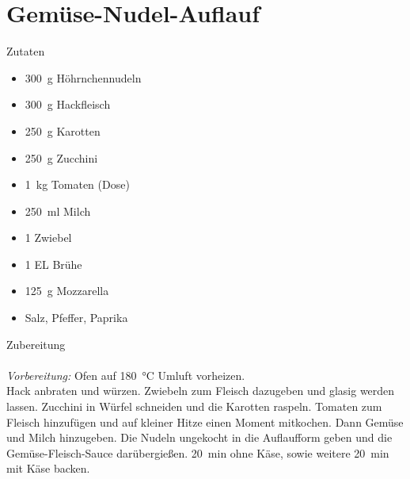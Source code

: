 \section*{Gemüse-Nudel-Auflauf}
\ihead{}\ohead{}
\cfoot{}
{\Large Zutaten}
\begin{multicols}{2}
\begin{itemize}
    \item \SI{300}{g} Höhrnchennudeln
    \item \SI{300}{g} Hackfleisch
    \item \SI{250}{g} Karotten
    \item \SI{250}{g} Zucchini
    \item \SI{1}{kg} Tomaten (Dose)
    \item \SI{250}{ml} Milch
    \item \num{1} Zwiebel
    \item \num{1} EL Brühe
    \item \SI{125}{g} Mozzarella
    \item Salz, Pfeffer, Paprika
\end{itemize}
\end{multicols}
\noindent
{\Large Zubereitung}\\
\\
\textit{Vorbereitung:} Ofen auf \SI{180}{\celsius} Umluft vorheizen.\\
Hack anbraten und würzen.
Zwiebeln zum Fleisch dazugeben und glasig werden lassen.
Zucchini in Würfel schneiden und die Karotten raspeln. 
Tomaten zum Fleisch hinzufügen und auf kleiner Hitze einen Moment mitkochen.
Dann Gemüse und Milch hinzugeben.
Die Nudeln ungekocht in die Auflaufform geben und die Gemüse-Fleisch-Sauce darübergießen.
\SI{20}{min} ohne Käse, sowie weitere \SI{20}{min} mit Käse backen.